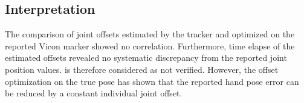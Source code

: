 \subsection{Interpretation}

The comparison of joint offsets estimated by the tracker and optimized on the reported Vicon marker showed no correlation. Furthermore, time elapse of the estimated offsets revealed no systematic discrepancy from the reported joint position values.  is therefore considered as not verified.
However, the offset optimization on the true pose has shown that the reported hand pose error can be reduced by a constant individual joint offset.
